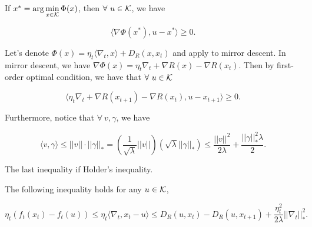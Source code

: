 \documentclass[../main.tex]{subfiles}
\begin{document}
\begin{lemma}\label{MD_lemma2}
If $x^* = \arg\min\limits_{x \in \mathcal{K}} \Phi(x)$, then $\forall \ u\in \mathcal{K}$, we have

\begin{equation}
\langle \nabla \Phi(x^*), u -x^* \rangle \geq 0.
\end{equation}	
\end{lemma}

Let's denote $\Phi(x) = \eta_t \langle \nabla_t, x \rangle + D_R(x,x_t)$ and apply to mirror descent. In mirror descent, we have $ \nabla \Phi(x) = \eta_t \nabla_t + \nabla R(x) - \nabla R(x_t)$. Then by first-order optimal condition, we have that $\forall \ u \in \mathcal{K}$

\begin{equation*}
	\langle \eta_t \nabla_t + \nabla R(x_{t+1}) - \nabla R(x_t) , u - x_{t+1} \rangle \geq 0.
\end{equation*}

\begin{lemma}\label{MD_lemma3}
	
	Furthermore, notice that $\forall \ v,\gamma$, we have
	
	\begin{equation*}
	\langle v, \gamma \rangle \leq ||v|| \cdot ||\gamma||_* = (\frac{1}{\sqrt{\lambda}} ||v||)(\sqrt{\lambda} ||\gamma||_*) \leq \frac{||v||^2}{2\lambda} + \frac{||\gamma||_*^2\lambda}{2} .
	\end{equation*}
	
	The last inequality if Holder's inequality.
\end{lemma}

\begin{lemma}\label{MD_lemma4}
	The following inequality holds for any $u \in \mathcal{K}$,
	
	\begin{equation*}
	\eta_t (f_t(x_t) - f_t(u)) \leq \eta_t \langle \nabla_t, x_t -u \rangle \leq D_R(u,x_t) - D_R(u,x_{t+1}) + \frac{\eta_t^2}{2\lambda} ||\nabla_t||_*^2.
	\end{equation*}
\end{lemma}
\end{document}
